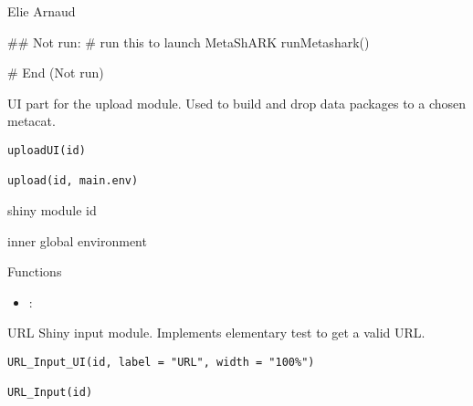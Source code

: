 \documentclass[letterpaper]{book}
\begin{document}
%
\begin{Author}\relax
Elie Arnaud 
\end{Author}
%
\begin{Examples}
\begin{ExampleCode}
## Not run:
# run this to launch MetaShARK
runMetashark()

# End (Not run)

\end{ExampleCode}
\end{Examples}
%
\begin{Description}\relax
UI part for the upload module. Used to build and drop
data packages to a chosen metacat.
\end{Description}
%
\begin{Usage}
\begin{verbatim}
uploadUI(id)

upload(id, main.env)
\end{verbatim}
\end{Usage}
%
\begin{Arguments}
\begin{ldescription}
\item[\code{id}] shiny module id

\item[\code{main.env}] inner global environment
\end{ldescription}
\end{Arguments}
%
\begin{Section}{Functions}
\begin{itemize}

\item{} : 

\end{itemize}
\end{Section}
%
\begin{Description}\relax
URL Shiny input module. Implements elementary test to get a valid URL.
\end{Description}
%
\begin{Usage}
\begin{verbatim}
URL_Input_UI(id, label = "URL", width = "100%")

URL_Input(id)
\end{verbatim}
\end{Usage}
\end{document}
